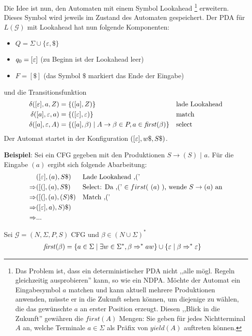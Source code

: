 Die Idee ist nun, den Automaten mit einem Symbol Lookahead \footnote{Das Problem ist, dass ein deterministischer PDA nicht ,,alle mögl. Regeln gleichzeitig ausprobieren'' kann, so wie ein NDPA. Möchte der Automat ein Eingabesymbol $a$ matchen und kann aktuell mehrere Produktionen anwenden, müsste er in die Zukunft sehen können, um diejenige zu wählen, die das gewünschte $a$ an erster Position erzeugt. Diesen ,,Blick in die Zukunft'' gewähren die $first(A)$ Mengen: Sie geben für jedes Nichtterminal $A$ an, welche Terminale $a \in \Sigma$ als Präfix von $yield(A)$ auftreten können.} 
erweitern. Dieses Symbol wird jeweils im Zustand des Automaten
gespeichert. Der PDA für $L (\mathcal{G})$ mit Lookahead hat nun
folgende Komponenten:
\begin{itemize}
\item $Q = \Sigma\cup \{\varepsilon, \$\}$
\item $q_0 = [\varepsilon]$ (zu Beginn ist der Lookahead leer)
\item $F = [\$]$  (das Symbol $\$$ markiert das Ende der Eingabe)
\end{itemize}
und die Transitionsfunktion
\begin{align*}
  \delta ([\varepsilon], a, Z) & = \{([a], Z) \} & & \text{lade Lookahead} \\
  \delta ([a], \varepsilon, a) & = \{([\varepsilon], \varepsilon) \} && \text{match}
  \\
  \delta ([a], \varepsilon, A) & = \{([a], \beta) \mid A\to\beta\in P, a \in
  \mathit{first} (\beta) \} && \text{select}
\end{align*}
Der Automat startet in der Konfiguration $([\varepsilon], w\$, S\$)$.

\textbf{Beispiel}: Sei ein CFG gegeben mit den Produktionen $S \to ( S )$ $ |$ $ a$. Für die Eingabe $(a)$ ergibt sich folgende Abarbeitung:
\begin{align*}
              & ([\varepsilon], (a), S\$ )   && \text{Lade Lookahead ,('}\\
  \Rightarrow & ([(], (a), S\$ )   && \text{Select: Da ,(' $\in first($ $(a)$ $ )$, wende $S \to (a)$ an}\\
  \Rightarrow & ([(], (a), (S)\$ ) && \text{Match ,('}\\
  \Rightarrow & ([\varepsilon], a), S)\$) \\
  \Rightarrow & ...
\end{align*}

\begin{Def}
  Sei $\mathcal{G} = (N, \Sigma, P, S)$ CFG und $\beta \in
  (N\cup\Sigma)^*$
  \begin{align*}
    \mathit{first} (\beta) &= \{ a \in \Sigma \mid \exists w\in
    \Sigma^* , \beta \=>^* aw \} \cup \{\Eps \mid \beta \=>^* \Eps \}
  \end{align*}
\end{Def}

